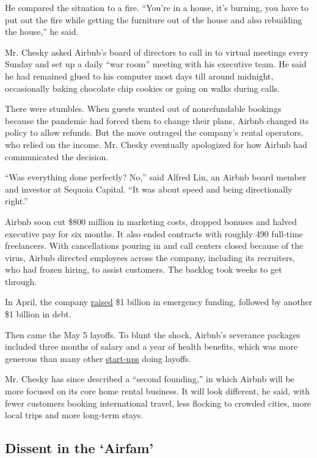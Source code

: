 He compared the situation to a fire. ``You're in a house, it's burning,
you have to put out the fire while getting the furniture out of the
house and also rebuilding the house,'' he said.

Mr. Chesky asked Airbnb's board of directors to call in to virtual
meetings every Sunday and set up a daily ``war room'' meeting with his
executive team. He said he had remained glued to his computer most days
till around midnight, occasionally baking chocolate chip cookies or
going on walks during calls.

There were stumbles. When guests wanted out of nonrefundable bookings
because the pandemic had forced them to change their plans, Airbnb
changed its policy to allow refunds. But the move outraged the company's
rental operators, who relied on the income. Mr. Chesky eventually
apologized for how Airbnb had communicated the decision.

``Was everything done perfectly? No,'' said Alfred Lin, an Airbnb board
member and investor at Sequoia Capital. ``It was about speed and being
directionally right.''

Airbnb soon cut \$800 million in marketing costs, dropped bonuses and
halved executive pay for six months. It also ended contracts with
roughly 490 full-time freelancers. With cancellations pouring in and
call centers closed because of the virus, Airbnb directed employees
across the company, including its recruiters, who had frozen hiring, to
assist customers. The backlog took weeks to get through.

In April, the company
\href{https://www.nytimes.com/2020/04/06/technology/airbnb-coronavirus-valuation.html}{raised}
\$1 billion in emergency funding, followed by another \$1 billion in
debt.

Then came the May 5 layoffs. To blunt the shock, Airbnb's severance
packages included three months of salary and a year of health benefits,
which was more generous than many other
\href{https://www.nytimes.com/2020/04/01/technology/virus-start-ups-pummeled-layoffs-unwinding.html}{start-ups}
doing layoffs.

Mr. Chesky has since described a ``second founding,'' in which Airbnb
will be more focused on its core home rental business. It will look
different, he said, with fewer customers booking international travel,
less flocking to crowded cities, more local trips and more long-term
stays.

\hypertarget{dissent-in-the-airfam}{%
\subsection{Dissent in the `Airfam'}\label{dissent-in-the-airfam}}

